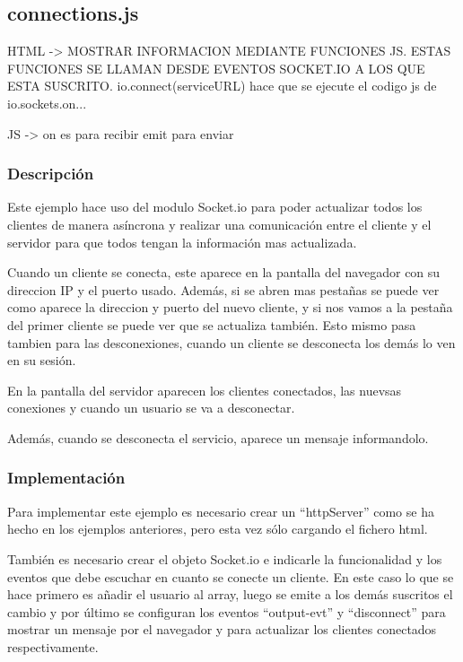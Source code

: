 \documentclass{article}
\begin{document}

\subsection{connections.js}
HTML -> MOSTRAR INFORMACION MEDIANTE FUNCIONES JS. ESTAS FUNCIONES SE LLAMAN DESDE EVENTOS SOCKET.IO A LOS QUE ESTA SUSCRITO. io.connect(serviceURL) hace que se ejecute el codigo js de io.sockets.on...

JS -> 
on es para recibir
emit para enviar
\subsubsection{Descripción}
Este ejemplo hace uso del modulo Socket.io para poder actualizar todos los clientes de manera asíncrona y realizar una comunicación entre el cliente y el servidor para que todos tengan la información mas actualizada.

Cuando un cliente se conecta, este aparece en la pantalla del navegador con su direccion IP y el puerto usado. Además, si se abren mas pestañas se puede ver como aparece la direccion y puerto del nuevo cliente, y si nos vamos a la pestaña del primer cliente se puede ver que se actualiza también. Esto mismo pasa tambien para las desconexiones, cuando un cliente se desconecta los demás lo ven en su sesión.

En la pantalla del servidor aparecen los clientes conectados, las nuevsas conexiones y cuando un usuario se va a desconectar.


Además, cuando se desconecta el servicio, aparece un mensaje informandolo.

\subsubsection{Implementación}
Para implementar este ejemplo es necesario crear un ``httpServer'' como se ha hecho en los ejemplos anteriores, pero esta vez sólo cargando el fichero html.

También es necesario crear el objeto Socket.io e indicarle la funcionalidad y los eventos que debe escuchar en cuanto se conecte un cliente. En este caso lo que se hace primero es añadir el usuario al array, luego se emite a los demás suscritos el cambio y por último se configuran los eventos ``output-evt'' y ``disconnect'' para mostrar un mensaje por el navegador y para actualizar los clientes conectados respectivamente.
\end{document}
